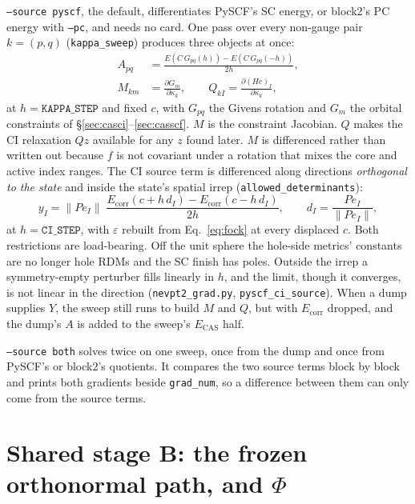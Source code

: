 \documentclass[11pt]{article}
\newcommand{\code}[1]{\texttt{#1}}
\newcommand{\eps}{\varepsilon}
\newcommand{\Ecas}{E_{\mathrm{CAS}}}
\newcommand{\Ecorr}{E_{\mathrm{corr}}}
\begin{document}
\code{--source pyscf}, the default, differentiates PySCF's SC energy, or
block2's PC energy with \code{--pc}, and needs no card. One pass over every
non-gauge pair $k = (p,q)$ (\code{kappa\_sweep}) produces three objects at
once:
\begin{align}
  A_{pq} &= \frac{E(C\,G_{pq}(h)) - E(C\,G_{pq}(-h))}{2h},
  \label{eq:Afd}\\
  M_{km} &= \frac{\partial G_m}{\partial\kappa_k},\qquad
  Q_{kI} = \frac{\partial (Hc)_I}{\partial\kappa_k},
  \label{eq:MQ}
\end{align}
at $h = \code{KAPPA\_STEP}$ and fixed $c$, with $G_{pq}$ the Givens rotation
and $G_m$ the orbital constraints of \S\ref{sec:casci}--\ref{sec:casscf}. $M$
is the constraint Jacobian. $Q$ makes the CI relaxation $Qz$ available for any
$z$ found later. $M$ is differenced rather than written out because $f$ is not
covariant under a rotation that mixes the core and active index ranges. The
CI source term is differenced along directions \emph{orthogonal to the state}
and inside the state's spatial irrep (\code{allowed\_determinants}):
\begin{equation}
  y_I = \|Pe_I\|\;\frac{\Ecorr(c + h\,d_I) - \Ecorr(c - h\,d_I)}{2h},\qquad
  d_I = \frac{Pe_I}{\|Pe_I\|},
  \label{eq:yfd}
\end{equation}
at $h = \code{CI\_STEP}$, with $\eps$ rebuilt from Eq.~\eqref{eq:fock} at
every displaced $c$. Both restrictions are load-bearing. Off the unit sphere
the hole-side metrics' constants are no longer hole RDMs and the SC finish has
poles. Outside the irrep a symmetry-empty perturber fills linearly in $h$, and
the limit, though it converges, is not linear in the direction
(\code{nevpt2\_grad.py}, \code{pyscf\_ci\_source}). When a dump supplies $Y$,
the sweep still runs to build $M$ and $Q$, but with $\Ecorr$ dropped, and the
dump's $A$ is added to the sweep's $\Ecas$ half.

\code{--source both} solves twice on one sweep, once from the dump and once
from PySCF's or block2's quotients. It compares the two source terms block by
block and prints both gradients beside \code{grad\_num}, so a difference
between them can only come from the source terms.

\section{\texorpdfstring{Shared stage B: the frozen orthonormal path, and $\Phi$}{Shared stage B: the frozen orthonormal path, and Phi}}
\label{sec:frozen}
\end{document}

